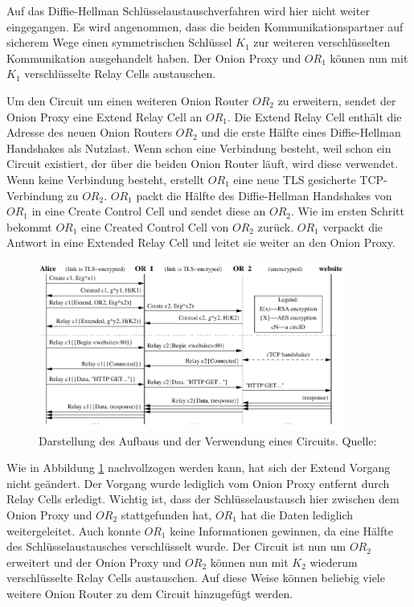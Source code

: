 \documentclass[fleqn,envcountsame,runningheads,10pt,a4paper]{llncs}
\begin{document}
Auf das Diffie-Hellman Schlüsselaustauschverfahren \cite{dh} wird hier nicht weiter eingegangen. Es wird angenommen, dass die beiden Kommunikationspartner auf sicherem Wege einen symmetrischen Schlüssel $K_1$ zur weiteren verschlüsselten Kommunikation ausgehandelt haben. Der Onion Proxy und $\textit{OR}_1$ können nun mit $K_1$ verschlüsselte Relay Cells austauschen. 

Um den Circuit um einen weiteren Onion Router $\textit{OR}_2$ zu erweitern, sendet der Onion Proxy eine Extend Relay Cell an $\textit{OR}_1$. Die Extend Relay Cell enthält die Adresse des neuen Onion Routers $\textit{OR}_2$ und die erste Hälfte eines Diffie-Hellman Handshakes als Nutzlast. Wenn schon eine Verbindung besteht, weil schon ein Circuit existiert, der über die beiden Onion Router läuft, wird diese verwendet. Wenn keine Verbindung besteht, erstellt $\textit{OR}_1$ eine neue TLS\cite{rfc:tls} gesicherte TCP-Verbindung zu $\textit{OR}_2$. $\textit{OR}_1$ packt die Hälfte des Diffie-Hellman Handshakes von $\textit{OR}_1$ in eine Create Control Cell und sendet diese an $\textit{OR}_2$. Wie im ersten Schritt bekommt $\textit{OR}_1$ eine Created Control Cell von $\textit{OR}_2$ zurück. $\textit{OR}_1$ verpackt die Antwort in eine Extended Relay Cell und leitet sie weiter an den Onion Proxy.

\begin{figure}[h]
  \begin{center}
    \includegraphics[width=0.9\textwidth]{pics/construction.pdf}
    \caption{Darstellung des Aufbaus und der Verwendung eines Circuits. Quelle: \cite{tor}}
    \label{fig:construction} 
  \end{center} 
\end{figure}

Wie in Abbildung \ref{fig:construction} nachvollzogen werden kann, hat sich der Extend Vorgang nicht geändert. Der Vorgang wurde lediglich vom Onion Proxy entfernt durch Relay Cells erledigt. Wichtig ist, dass der Schlüsselaustausch hier zwischen dem Onion Proxy und $\textit{OR}_2$ stattgefunden hat, $\textit{OR}_1$ hat die Daten lediglich weitergeleitet. Auch konnte $\textit{OR}_1$ keine Informationen gewinnen, da eine Hälfte des Schlüsselaustausches verschlüsselt wurde. Der Circuit ist nun um $\textit{OR}_2$ erweitert und der Onion Proxy und $\textit{OR}_2$ können nun mit $K_2$ wiederum verschlüsselte Relay Cells austauschen. Auf diese Weise können beliebig viele weitere Onion Router zu dem Circuit hinzugefügt werden.
\end{document}
